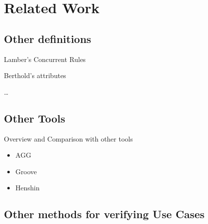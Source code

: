\chapter{Related Work}

\section{Other definitions}

Lamber's Concurrent Rules

Berthold's attributes

\ldots

\section{Other Tools}

Overview and Comparison with other tools

\begin{itemize}
\item AGG
\item Groove
\item Henshin
\end{itemize}

\section{Other methods for verifying Use Cases}
